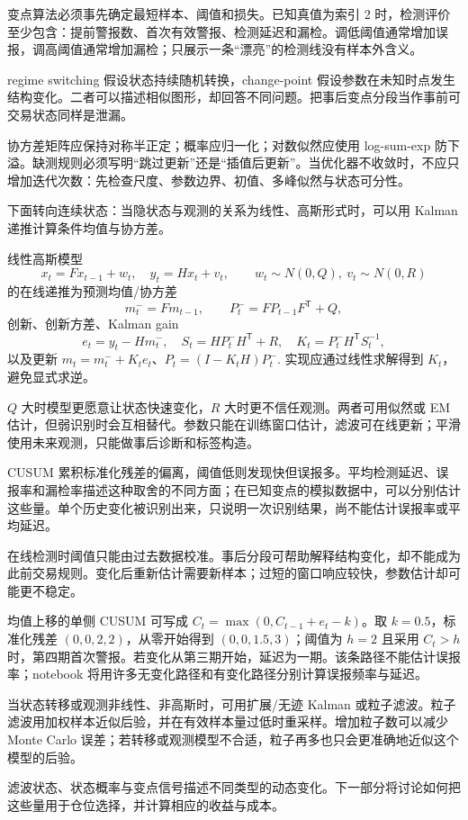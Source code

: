 
变点算法必须事先确定最短样本、阈值和损失。已知真值为索引 2 时，检测评价至少包含：提前警报数、首次有效警报、检测延迟和漏检。调低阈值通常增加误报，调高阈值通常增加漏检；只展示一条“漂亮”的检测线没有样本外含义。

regime switching 假设状态持续随机转换，change-point 假设参数在未知时点发生结构变化。二者可以描述相似图形，却回答不同问题。把事后变点分段当作事前可交易状态同样是泄漏。


协方差矩阵应保持对称半正定；概率应归一化；对数似然应使用 log-sum-exp 防下溢。缺测规则必须写明“跳过更新”还是“插值后更新”。当优化器不收敛时，不应只增加迭代次数：先检查尺度、参数边界、初值、多峰似然与状态可分性。

下面转向连续状态：当隐状态与观测的关系为线性、高斯形式时，可以用 Kalman 递推计算条件均值与协方差。


线性高斯模型
\[
x_t=Fx_{t-1}+w_t,\quad y_t=Hx_t+v_t,
\qquad w_t\sim N(0,Q),\ v_t\sim N(0,R)
\]
的在线递推为预测均值/协方差
\[
m_t^-=Fm_{t-1},\qquad P_t^-=FP_{t-1}F^{\mathsf T}+Q,
\]
创新、创新方差、Kalman gain
\[
e_t=y_t-Hm_t^-,\quad S_t=HP_t^-H^{\mathsf T}+R,
\quad K_t=P_t^-H^{\mathsf T}S_t^{-1},
\]
以及更新 $m_t=m_t^-+K_te_t$、$P_t=(I-K_tH)P_t^-$. 实现应通过线性求解得到 $K_t$，避免显式求逆。

$Q$ 大时模型更愿意让状态快速变化，$R$ 大时更不信任观测。两者可用似然或 EM 估计，但弱识别时会互相替代。参数只能在训练窗口估计，滤波可在线更新；平滑使用未来观测，只能做事后诊断和标签构造。


CUSUM 累积标准化残差的偏离，阈值低则发现快但误报多。平均检测延迟、误报率和漏检率描述这种取舍的不同方面；在已知变点的模拟数据中，可以分别估计这些量。单个历史变化被识别出来，只说明一次识别结果，尚不能估计误报率或平均延迟。

在线检测时阈值只能由过去数据校准。事后分段可帮助解释结构变化，却不能成为此前交易规则。变化后重新估计需要新样本；过短的窗口响应较快，参数估计却可能更不稳定。


均值上移的单侧 CUSUM 可写成 $C_t=\max(0,C_{t-1}+e_t-k)$。取 $k=0.5$，标准化残差 $(0,0,2,2)$，从零开始得到 $(0,0,1.5,3)$；阈值为 $h=2$ 且采用 $C_t>h$ 时，第四期首次警报。若变化从第三期开始，延迟为一期。该条路径不能估计误报率；notebook 将用许多无变化路径和有变化路径分别计算误报频率与延迟。


当状态转移或观测非线性、非高斯时，可用扩展/无迹 Kalman 或粒子滤波。粒子滤波用加权样本近似后验，并在有效样本量过低时重采样。增加粒子数可以减少 Monte Carlo 误差；若转移或观测模型不合适，粒子再多也只会更准确地近似这个模型的后验。

滤波状态、状态概率与变点信号描述不同类型的动态变化。下一部分将讨论如何把这些量用于仓位选择，并计算相应的收益与成本。
